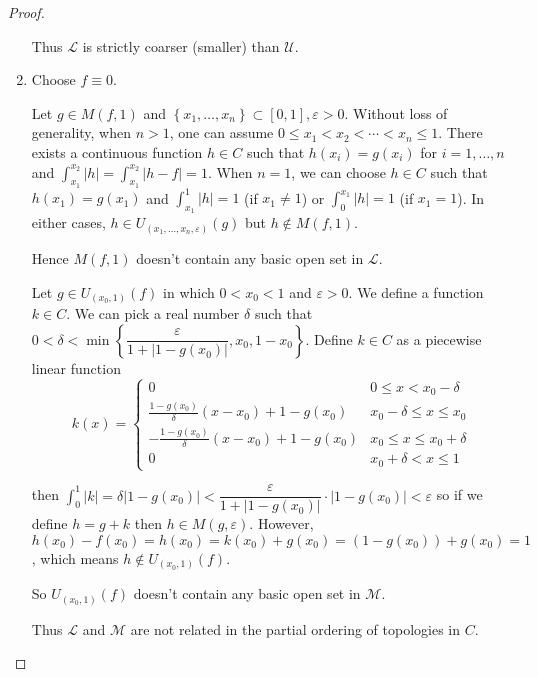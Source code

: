 \begin{proof}
\begin{enumerate}[label={(\alph*)}]
		      Thus \( \mathscr{L} \) is strictly coarser (smaller) than \( \mathscr{U} \).
		\item Choose \( f \equiv 0 \).

		      Let \( g \in M(f, 1) \) and \( \left\{ x_{1}, \ldots, x_{n} \right\} \subset [0, 1], \varepsilon > 0 \). Without loss of generality, when \( n > 1 \), one can assume \( 0 \le x_{1} < x_{2} < \cdots < x_{n} \le 1 \). There exists a continuous function \( h \in C \) such that \( h(x_{i}) = g(x_{i}) \) for \( i = 1, \ldots, n \) and \( \int_{x_{1}}^{x_{2}}\left\vert h \right\vert = \int_{x_{1}}^{x_{2}}\left\vert h - f \right\vert = 1 \). When \( n = 1 \), we can choose \( h \in C \) such that \( h(x_{1}) = g(x_{1}) \) and \( \int_{x_{1}}^{1}\left\vert h \right\vert = 1 \) (if \( x_{1} \ne 1 \)) or \( \int_{0}^{x_{1}}\left\vert h \right\vert = 1 \) (if \( x_{1} = 1 \)). In either cases, \( h \in U_{(x_{1}, \ldots, x_{n}, \varepsilon)}(g) \) but \( h \notin M(f, 1) \).

		      Hence \( M(f, 1) \) doesn't contain any basic open set in \( \mathscr{L} \).

		      Let \( g \in U_{(x_{0}, 1)}(f) \) in which \( 0 < x_{0} < 1 \) and \( \varepsilon > 0 \). We define a function \( k \in C \). We can pick a real number \( \delta \) such that \( 0 < \delta < \min\left\{ \dfrac{\varepsilon}{1 + \left\vert 1 - g(x_{0}) \right\vert}, x_{0}, 1 - x_{0} \right\} \). Define \( k \in C \) as a piecewise linear function
		      \[
			      k(x) = \begin{cases}
				      0                                                      & 0 \le x < x_{0} - \delta       \\
				      \frac{1 - g(x_{0})}{\delta}(x - x_{0}) + 1 - g(x_{0})  & x_{0} - \delta \le x \le x_{0} \\
				      -\frac{1 - g(x_{0})}{\delta}(x - x_{0}) + 1 - g(x_{0}) & x_{0} \le x \le x_{0} + \delta \\
				      0                                                      & x_{0} + \delta < x \le 1
			      \end{cases}
		      \]

		      then \( \int_{0}^{1}\left\vert k \right\vert = \delta\left\vert 1 - g(x_{0}) \right\vert < \dfrac{\varepsilon}{1 + \left\vert 1 - g(x_{0})\right\vert} \cdot \left\vert 1 - g(x_{0}) \right\vert < \varepsilon \) so if we define \( h = g + k \) then \( h \in M(g, \varepsilon) \). However, \( h(x_{0}) - f(x_{0}) = h(x_{0}) = k(x_{0}) + g(x_{0}) = (1 - g(x_{0})) + g(x_{0}) = 1 \), which means \( h \notin U_{(x_{0}, 1)}(f) \).

		      So \( U_{(x_{0}, 1)}(f) \) doesn't contain any basic open set in \( \mathscr{M} \).

		      Thus \( \mathscr{L} \) and \( \mathscr{M} \) are not related in the partial ordering of topologies in \( C \).
	\end{enumerate}
\end{proof}

